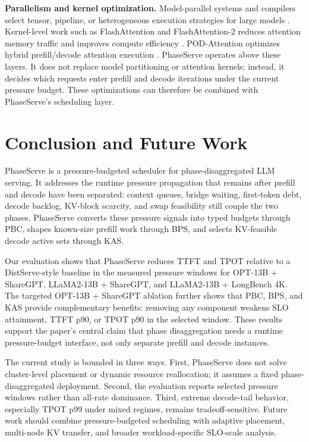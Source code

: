 \documentclass[lettersize,journal]{IEEEtran}
\begin{document}
\textbf{Parallelism and kernel optimization.} Model-parallel systems and compilers select tensor, pipeline, or heterogeneous execution strategies for large models \cite{alpaserve,megatron,alpa,pope,hetegen,exegpt,helix}. Kernel-level work such as FlashAttention and FlashAttention-2 reduces attention memory traffic and improves compute efficiency \cite{flashattention,flashattention2}. POD-Attention optimizes hybrid prefill/decode attention execution \cite{pod}. PhaseServe operates above these layers. It does not replace model partitioning or attention kernels; instead, it decides which requests enter prefill and decode iterations under the current pressure budget. These optimizations can therefore be combined with PhaseServe's scheduling layer.

\section{Conclusion and Future Work}
\label{conclusion}

PhaseServe is a pressure-budgeted scheduler for phase-disaggregated LLM serving. It addresses the runtime pressure propagation that remains after prefill and decode have been separated: context queues, bridge waiting, first-token debt, decode backlog, KV-block scarcity, and swap feasibility still couple the two phases. PhaseServe converts these pressure signals into typed budgets through PBC, shapes known-size prefill work through BPS, and selects KV-feasible decode active sets through KAS.

Our evaluation shows that PhaseServe reduces TTFT and TPOT relative to a DistServe-style baseline in the measured pressure windows for OPT-13B + ShareGPT, LLaMA2-13B + ShareGPT, and LLaMA2-13B + LongBench 4K. The targeted OPT-13B + ShareGPT ablation further shows that PBC, BPS, and KAS provide complementary benefits: removing any component weakens SLO attainment, TTFT p90, or TPOT p90 in the selected window. These results support the paper's central claim that phase disaggregation needs a runtime pressure-budget interface, not only separate prefill and decode instances.

The current study is bounded in three ways. First, PhaseServe does not solve cluster-level placement or dynamic resource reallocation; it assumes a fixed phase-disaggregated deployment. Second, the evaluation reports selected pressure windows rather than all-rate dominance. Third, extreme decode-tail behavior, especially TPOT p99 under mixed regimes, remains tradeoff-sensitive. Future work should combine pressure-budgeted scheduling with adaptive placement, multi-node KV transfer, and broader workload-specific SLO-scale analysis.
\end{document}
